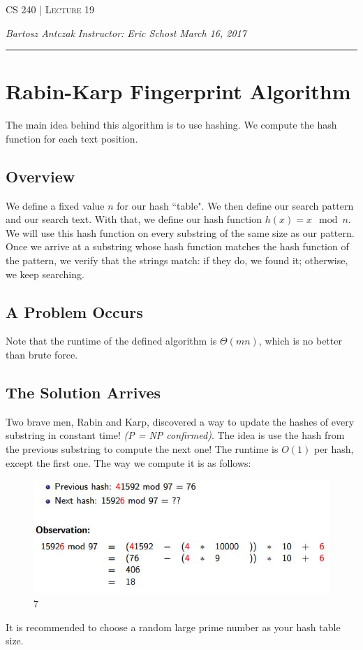 \documentclass{report}
\newcommand{\lectureNum}{19}
\newcommand{\curDate}{March 16, 2017}
\newcommand{\course}{CS 240}
\begin{document}
\begin{center}
\begin{Large}
\textsc{\course{} | Lecture \lectureNum{}}
\end{Large}
\end{center} 
\noindent \textit{Bartosz Antczak} \hfill
\textit{Instructor: Eric Schost} \hfill
\textit{\curDate{}}
\rule{\textwidth}{0.4pt}
\section{Rabin-Karp Fingerprint Algorithm}
The main idea behind this algorithm is to use hashing. We compute the hash function for each text position.
\subsection{Overview}
We define a fixed value $n$ for our hash ``table". We then define our search pattern and our search text. With that, we define our hash function $h(x) = x \mod n$. We will use this hash function on every substring of the same size as our pattern. Once we arrive at a substring whose hash function matches the hash function of the pattern, we verify that the strings match: if they do, we found it; otherwise, we keep searching.
\subsection{A Problem Occurs}
Note that the runtime of the defined algorithm is $\Theta(mn)$, which is no better than brute force.
\subsection{The Solution Arrives}
Two brave men, Rabin and Karp, discovered a way to update the hashes of every substring in constant time! \textit{(P = NP confirmed)}.
The idea is use the hash from the previous substring to compute the next one! The runtime is $O(1)$ per hash, except the first one.
The way we compute it is as follows:
\begin{figure}[ht]
\begin{center}
\includegraphics[scale=0.7]{comp.jpg}7
\end{center}
\end{figure}
It is recommended to choose a random large prime number as your hash table size.
\end{document}
